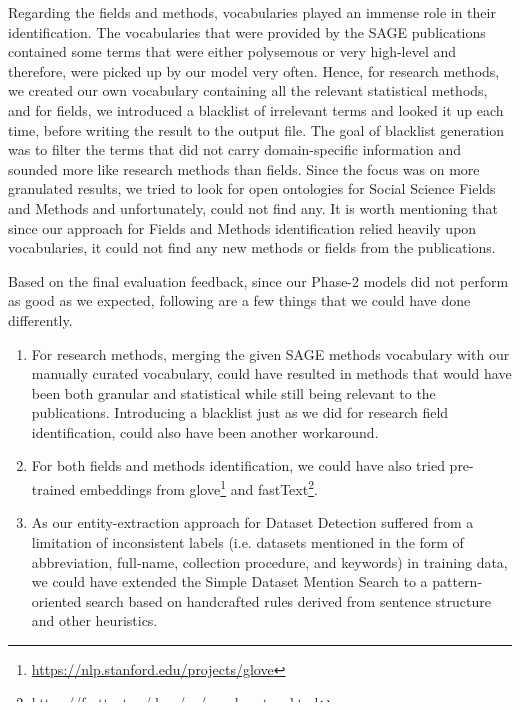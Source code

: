 \documentclass[runningheads]{llncs}
\begin{document}
	Regarding the fields and methods, vocabularies played an immense role in their identification. The vocabularies that were provided by the SAGE publications contained some terms that were either polysemous or very high-level and therefore, were picked up by our model very often. Hence, for research methods, we created our own vocabulary containing all the relevant statistical methods, and for fields, we introduced a blacklist of irrelevant terms and looked it up each time, before writing the result to the output file. The goal of blacklist generation was to filter the terms that did not carry domain-specific information and sounded more like research methods than fields. Since the focus was on more granulated results, we tried to look for open ontologies for Social Science Fields and Methods and unfortunately, could not find any. It is worth mentioning that since our approach for Fields and Methods identification relied heavily upon vocabularies, it could not find any new methods or fields from the publications. 
	
	Based on the final evaluation feedback, since our Phase-2 models did not perform as good as we expected, following are a few things that we could have done differently.
	\begin{enumerate}
		\item For research methods, merging the given SAGE methods vocabulary with our manually curated vocabulary, could have resulted in methods that would have been both granular and statistical while still being relevant to the publications. Introducing a blacklist just as we did for research field identification, could also have been another workaround. 
		\item For both fields and methods identification, we could have also tried pre-trained embeddings from glove\footnote{\url{https://nlp.stanford.edu/projects/glove}} and fastText\footnote{\url{https://fasttext.cc/docs/en/crawl-vectors.html}}.
		\item As our entity-extraction approach for Dataset Detection suffered from a limitation of inconsistent labels (i.e. datasets mentioned in the form of abbreviation, full-name, collection procedure, and keywords) in training data, we could have extended the Simple Dataset Mention Search to a pattern-oriented search based on handcrafted rules derived from sentence structure and other heuristics. 
	\end{enumerate}
	
\end{document}
